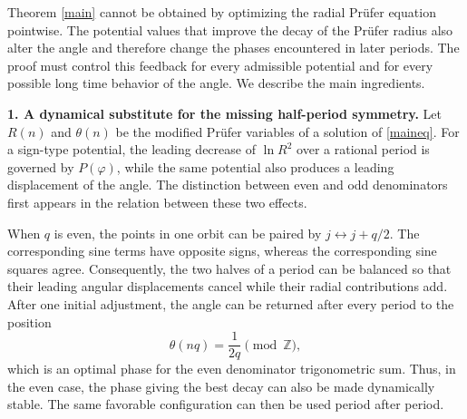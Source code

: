 \documentclass[12pt]{amsart}
\theoremstyle{plain}
\newcommand{\Z}{\mathbb{Z}}
\theoremstyle{definition}
\begin{document}
Theorem \ref{main} cannot be obtained by optimizing the radial Pr\"ufer equation pointwise. The potential values that improve the
decay of the Pr\"ufer radius also alter the angle and therefore change
the phases encountered in later periods. The proof must control this
feedback for every admissible potential and for every possible
long time behavior of the angle. We describe the main
ingredients.

\medskip
\noindent\textbf{1. A dynamical substitute for the missing
	half-period symmetry.}
Let $R(n)$ and $\theta(n)$ be the modified Pr\"ufer variables of a
solution of \eqref{maineq}.  For a sign-type potential, the leading
decrease of $\ln R^2$ over a rational period is governed by
$P(\varphi)$, while the same potential also produces a leading
displacement of the angle.  The distinction between even and odd
denominators first appears in the relation between these two effects.

When $q$ is even, the points in one orbit can be paired by
$j\leftrightarrow j+q/2$.  The corresponding sine terms have opposite
signs, whereas the corresponding sine squares agree.  Consequently,
the two halves of a period can be balanced so that their leading
angular displacements cancel while their radial contributions add.
After one initial adjustment, the angle can be returned after every
period to the position 
$$\theta(nq)=\frac{1}{2q}\pmod\Z,$$
which is an
optimal phase for the even denominator trigonometric sum.  Thus, in
the even case, the phase giving the best decay can also be made
dynamically stable.  The same favorable configuration can then be
used period after period.
\end{document}
